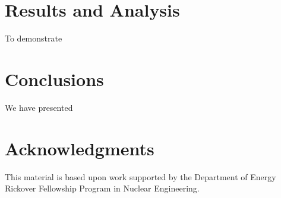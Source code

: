 \documentclass{anstrans}
\begin{document}
\section{Results and Analysis}

To demonstrate 


\section{Conclusions}

We have presented 


\section{Acknowledgments}
This material is based upon work supported by the Department of Energy Rickover Fellowship Program in Nuclear Engineering.



\end{document}
